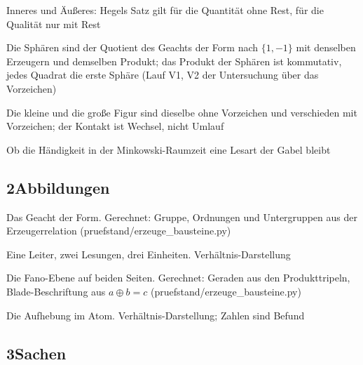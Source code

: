 \documentclass[11pt,a4paper]{article}
\begin{document}
\begin{description}[itemsep=1pt,font=\normalfont\bfseries]
\item[Deutung:] Inneres und Äußeres: Hegels Satz gilt für die Quantität ohne Rest, für die Qualität nur mit Rest
\item[Satz:] Die Sphären sind der Quotient des Geachts der Form nach $\{1,-1\}$ mit denselben Erzeugern und demselben Produkt; das Produkt der Sphären ist kommutativ, jedes Quadrat die erste Sphäre (Lauf V1, V2 der Untersuchung über das Vorzeichen)
\item[Deutung:] Die kleine und die große Figur sind dieselbe ohne Vorzeichen und verschieden mit Vorzeichen; der Kontakt ist Wechsel, nicht Umlauf
\item[Offen:] Ob die Händigkeit in der Minkowski-Raumzeit eine Lesart der Gabel bleibt
\end{description}

\subsection*{2\quad Abbildungen}

\begin{description}[itemsep=1pt,font=\normalfont\bfseries]
\item[Abb.~\ref{fig:geacht}] Das Geacht der Form. Gerechnet: Gruppe, Ordnungen und Untergruppen aus der Erzeugerrelation (pruefstand/erzeuge\_bausteine.py)
\item[Abb.~\ref{fig:leitern}] Eine Leiter, zwei Lesungen, drei Einheiten. Verhältnis-Darstellung
\item[Abb.~\ref{fig:fano}] Die Fano-Ebene auf beiden Seiten. Gerechnet: Geraden aus den Produkttripeln, Blade-Beschriftung aus $a\oplus b=c$ (pruefstand/erzeuge\_bausteine.py)
\item[Abb.~\ref{fig:atom}] Die Aufhebung im Atom. Verhältnis-Darstellung; Zahlen sind Befund
\end{description}

\subsection*{3\quad Sachen}
\end{document}
